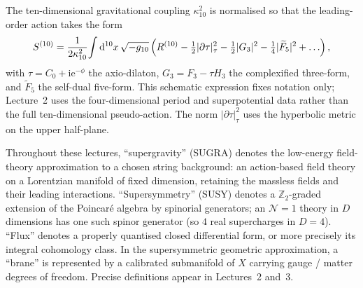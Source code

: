 The
ten-dimensional gravitational coupling $\kappa_{10}^2$ is normalised
so that the leading-order action takes the form
\begin{equation}\label{eq:S10-norm}
    S^{(10)} =
    \frac{1}{2\kappa_{10}^2}\!
    \int \mathrm{d}^{10}x\,\sqrt{-g_{10}}\,
        \Bigl(R^{(10)} - \tfrac{1}{2}|\partial\tau|^2_\tau
            - \tfrac{1}{2}|G_3|^2 - \tfrac{1}{4}|\widetilde F_5|^2
            + \ldots\Bigr) \,,
\end{equation}
with $\tau = C_0 + \mathrm{i} \mathrm{e}^{-\phi}$ the axio-dilaton,
$G_3 = F_3 - \tau H_3$ the complexified three-form, and
$\widetilde F_5$ the
self-dual five-form.  This schematic expression fixes notation only;
Lecture~2 uses the four-dimensional period and superpotential data
rather than the full ten-dimensional pseudo-action.  The norm
$|\partial\tau|^2_\tau$ uses the hyperbolic metric on the upper
half-plane.

\begin{remark}
Throughout these lectures, ``supergravity'' (SUGRA) denotes the
low-energy field-theory approximation to a chosen string background:
an action-based field theory on a Lorentzian manifold of fixed
dimension, retaining the massless fields and their leading
interactions. ``Supersymmetry'' (SUSY) denotes a
$\mathbb{Z}_2$-graded extension of the Poincar\'e algebra by
spinorial generators; an $\mathcal{N}=1$ theory in $D$ dimensions
has one such spinor generator (so $4$ real supercharges in $D=4$).
``Flux'' denotes a properly quantised closed differential form, or
more precisely its integral cohomology class. In the supersymmetric
geometric approximation, a ``brane'' is represented by a calibrated
submanifold of $X$ carrying gauge / matter degrees of freedom.
Precise definitions appear in Lectures~2 and~3.
\end{remark}
